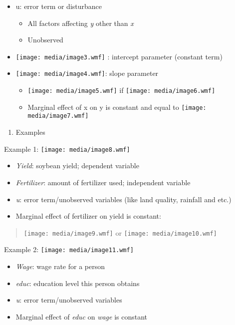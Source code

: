 \begin{itemize}
\item
  u: error term or disturbance

  \begin{itemize}
  \item
    All factors affecting \emph{y} other than \emph{x}
  \item
    Unobserved
  \end{itemize}
\item
  \texttt{[image: media/image3.wmf]} : intercept parameter (constant
  term)
\item
  \texttt{[image: media/image4.wmf]}: slope parameter

  \begin{itemize}
  \item
    \texttt{[image: media/image5.wmf]} if
    \texttt{[image: media/image6.wmf]}
  \item
    Marginal effect of x on y is constant and equal to
    \texttt{[image: media/image7.wmf]}
  \end{itemize}
\end{itemize}

\begin{enumerate}
\def\labelenumi{\arabic{enumi}.}
\setcounter{enumi}{2}
\item
  Examples
\end{enumerate}

Example 1: \texttt{[image: media/image8.wmf]}

\begin{itemize}
\item
  \emph{Yield}: soybean yield; dependent variable
\item
  \emph{Fertilizer}: amount of fertilizer used; independent variable
\item
  \emph{u}: error term/unobserved variables (like land quality, rainfall
  and etc.)
\item
  Marginal effect of fertilizer on yield is constant:
\end{itemize}

\begin{quote}
\texttt{[image: media/image9.wmf]} or
\texttt{[image: media/image10.wmf]}
\end{quote}

Example 2: \texttt{[image: media/image11.wmf]}

\begin{itemize}
\item
  \emph{Wage}: wage rate for a person
\item
  \emph{educ}: education level this person obtains
\item
  \emph{u}: error term/unobserved variables
\item
  Marginal effect of \emph{educ} on \emph{wage} is constant
\end{itemize}

